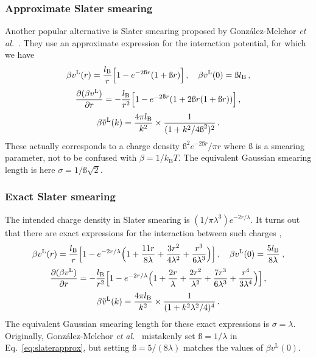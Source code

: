 \documentclass[12pt,a4paper]{article}
\newcommand{\latin}[1]{\emph{#1}}
\newcommand{\etal}{\latin{et al.}}
\newcommand{\kB}{k_{\mathrm{B}}}
\newcommand{\kT}{\kB T}
\newcommand{\lr}{^{\mathrm{L}}}
\newcommand{\varbeta}{\text{\ss}}
\newcommand{\Eqref}[1]{Eq.~\eqref{#1}}
\begin{document}
\subsubsection{Approximate Slater smearing}
%
Another popular alternative is Slater smearing proposed by
Gonz\'alez-Melchor \etal\ \cite{GM+06}.  They use an approximate
expression for the interaction potential, for which we have
%
\begin{equation}
  \beta v\lr(r)=\frac{\lB}{r}\Bigl[1-e^{-2\varbeta r}(1+\varbeta r)\Bigr]\,,
  \quad \beta v\lr(0)=\varbeta\lB\,,
  \label{eq:slaterapprox}
\end{equation}
%
\begin{equation}
  \frac{\partial(\beta v\lr)}{\partial r}=
  -\frac{\lB}{r^2}\Bigl[1-e^{-2\varbeta r}(1+2\varbeta r(1+\varbeta r))\Bigr]\,,
\end{equation}
%
\begin{equation}
  \beta {\tilde v}\lr(k)=\frac{4\pi\lB}{k^2}
  \times\frac{1}{(1+k^2/4\varbeta^2)^2}\,.
\end{equation}
%
These actually corresponds to a charge density $\varbeta^2
e^{-2\varbeta r}/\pi r$ where $\varbeta$ is a smearing parameter, not
to be confused with $\beta=1/\kT$. The equivalent Gaussian smearing
length is here $\sigma=1/\varbeta\sqrt{2}$.

\subsubsection{Exact Slater smearing}
%
The intended charge density in Slater smearing is
$(1/\pi\lambda^3)e^{-2r/\lambda}$.  It turns out that there are exact
expressions for the interaction between such charges \cite{WV14},
%
\begin{equation}
  \beta v\lr(r)=\frac{\lB}{r}\Bigl[1-e^{-2r/\lambda}\Bigl(
    1+\frac{11r}{8\lambda}+\frac{3r^2}{4\lambda^2}
    +\frac{r^3}{6\lambda^3}\Bigr)\Bigr]\,,
  \quad \beta v\lr(0)=\frac{5\lB}{8\lambda}\>,
  \label{eq:slaterexact}
\end{equation}
%
\begin{equation}
  \frac{\partial(\beta v\lr)}{\partial r}=
  -\frac{\lB}{r^2}\Bigl[1-e^{-2r/\lambda}\Bigl(
    1+\frac{2r}{\lambda}+\frac{2r^2}{\lambda^2}
    +\frac{7r^3}{6\lambda^3}+\frac{r^4}{3\lambda^4}\Bigr)\Bigr]\,,
\end{equation}
%
\begin{equation}
  \beta {\tilde v}\lr(k)=\frac{4\pi\lB}{k^2}
  \times\frac{1}{(1+k^2\lambda^2/4)^4}\,.
\end{equation}
%
The equivalent Gaussian smearing length for these exact expressions is
$\sigma=\lambda$.  Originally, Gon\-z\'a\-lez-Melchor
\etal\ \cite{GM+06} mistakenly set $\varbeta=1/\lambda$ in
\Eqref{eq:slaterapprox}, but setting
$\varbeta=5/(8\lambda)$ matches the values of $\beta v\lr(0)$.
\end{document}
